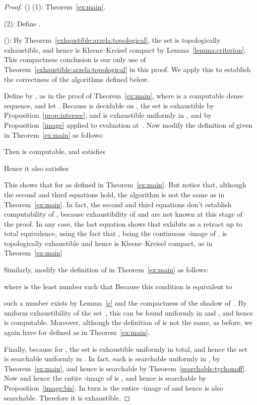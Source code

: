 \documentclass{LMCS}
\begin{document}
\begin{proof}
() (1): Theorem~\ref{ex:main}.

\medskip

(2): Define .

\medskip

(): By Theorem~\ref{exhaustible:arzela:topological}, the
set  is topologically exhaustible, and hence is Kleene--Kreisel
compact by Lemma~\ref{lemma:criterion}. This compactness conclusion is
our only use of Theorem~\ref{exhaustible:arzela:topological} in this
proof. We apply this to establish the correctness of the algorithms
defined below.

Define  by , as
in the proof of Theorem~\ref{ex:main}, where  is a
computable dense sequence, and let .  Because
 is decidable on , the set  is
exhaustible by Proposition~\ref{prop:intersec}, and  is
exhaustible uniformly in ,  and  by
Proposition~\ref{image} applied to evaluation at~.
Now modify the definition of 
given in Theorem~\ref{ex:main} as follows:

Then  is computable, and satisfies

Hence it also satisfies

This shows that  for  as defined in Theorem~\ref{ex:main}.
But notice that, although the second and third equations hold, the
algorithm is not the same as in Theorem~\ref{ex:main}.  In fact, the
second and third equations don't establish computability of ,
because exhaustibility of  and  are not known at this stage of
the proof. In any case, the last equation shows that  exhibits 
as a retract up to total equivalence, using the fact that , being
the continuous -image of , is topologically exhaustible and
hence is Kleene--Kreisel compact, as in Theorem~\ref{ex:main}

Similarly, modify the definition of  in Theorem~\ref{ex:main} as follows:

where
 is the least number such that 
Because this condition is equivalent to

such a number exists by Lemma~\ref{c} and the compactness of the
  shadow of~. By uniform exhaustibility of the
  set~, this can be found uniformly in 
  and , and hence  is computable. Moreover, although the
  definition of  is not the same, as before, we again have 
  for  defined as in Theorem~\ref{ex:main}.

  Finally, because  for , the set 
  is exhaustible uniformly in  total, and hence the set  is searchable uniformly in .  In fact, each  is searchable
  uniformly in , by Theorem~\ref{ex:main}, and hence  is
  searchable by Theorem~\ref{searchable:tychonoff}. Now  and hence the entire -image of  is , and hence  is
  searchable by Proposition~\ref{image:bis}. In turn  is the entire
  -image of  and hence is also searchable.  Therefore it is
  exhaustible.
\end{proof}
\end{document}
